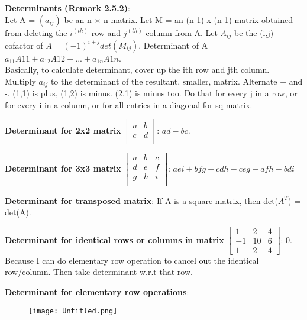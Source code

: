 \documentclass[a4paper,landscape]{article}
\newcommand{\rnname}[1]{\textbf{#1}}
\begin{document}
\begin{multicols*}{4}
\begin{flatitemize}
\item \rnname{Determinants (Remark 2.5.2)}:\\
Let A = $(a_{ij})$ be an n $\times$ n matrix.
Let M = an (n-1) x (n-1) matrix obtained from deleting the $i^(th)$ row and $j^(th)$ column from A.
Let $A_{ij}$ be the (i,j)-cofactor of $A = (-1)^{i+j}det(M_{ij})$.
Determinant of A = $a_{11}A{11} + a_{12}A{12} + ... + a_{1n}A{1n}$. \\
Basically, to calculate determinant, cover up the ith row and jth column. Multiply $a_{ij}$ to the determinant of the resultant, smaller, matrix. Alternate + and -. (1,1) is plus, (1,2) is minus. (2,1) is minus too. Do that for every j in a row, or for every i in a column, or for all entries in a diagonal for sq matrix.

\item \rnname{Determinant for 2x2 matrix}
$\begin{bmatrix}
    a & b \\
    c & d \\
\end{bmatrix}$: $ad-bc$.
\item \rnname{Determinant for 3x3 matrix}
$\begin{bmatrix}
	a & b & c \\
    d & e & f \\
    g & h & i \\
\end{bmatrix}$: $aei + bfg + cdh - ceg - afh - bdi$
\item \rnname{Determinant for transposed matrix}: If A is a square matrix, then det($A^T$) = det(A).
\item \rnname{Determinant for identical rows or columns in matrix}
$\begin{bmatrix}
    1 & 2 & 4 \\
    -1 & 10 & 6 \\
    1 & 2 & 4
\end{bmatrix}$: 0.\\
Because I can do elementary row operation to cancel out the identical row/column. Then take determinant w.r.t that row.

\item \rnname{Determinant for elementary row operations}: 
\vspace{-1.5em}
\begin{figure}[H]
  \texttt{[image: Untitled.png]}
\end{figure}
\vspace{-1.5em}


\end{flatitemize}
\end{multicols*}
\end{document}
